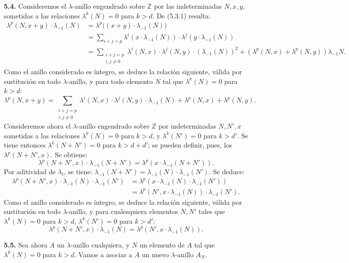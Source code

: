\textbf{5.4.} Consideremos el \(\lambda\)-anillo engendrado sobre \(\mathbb Z\) por las indeterminadas \(N,x,y\), sometidas a las relaciones \(\lambda^k(N)=0\) para \(k>d\). De (5.3.1) resulta:
\begin{align*}
  \lambda^p(N,x+y)\cdot\lambda_{-1}(N)
  &=\lambda^p\bigl((x+y)\cdot\lambda_{-1}(N)\bigr)\\
  &=\sum_{i+j=p}\lambda^i(x\cdot\lambda_{-1}(N))\cdot\lambda^j(y\cdot\lambda_{-1}(N))\\
  &=\sum_{\substack{i+j=p\\ i,j\ne0}}\lambda^i(N,x)\cdot\lambda^j(N,y)\cdot(\lambda_{-1}(N))^2
    +(\lambda^p(N,x)+\lambda^p(N,y))\lambda_{-1}N.
\end{align*}
Como el anillo considerado es íntegro, se deduce la relación siguiente, válida por sustitución en todo \(\lambda\)-anillo, y para todo elemento \(N\) tal que \(\lambda^k(N)=0\) para \(k>d\):
\begin{equation}\tag{5.4.1}
  \lambda^p(N,x+y)=\sum_{\substack{i+j=p\\ i,j\ne0}}\lambda^i(N,x)\cdot\lambda^j(N,y)\cdot\lambda_{-1}(N)+\lambda^p(N,x)+\lambda^p(N,y).
\end{equation}
Consideremos ahora el \(\lambda\)-anillo engendrado sobre \(\mathbb Z\) por indeterminadas \(N,N',x\) sometidas a las relaciones \(\lambda^k(N)=0\) para \(k>d\), y \(\lambda^k(N')=0\) para \(k>d'\). Se tiene entonces \(\lambda^k(N+N')=0\) para \(k>d+d'\); se pueden definir, pues, los \(\lambda^p(N+N',x)\). Se obtiene:
\[
  \lambda^p(N+N',x)\cdot\lambda_{-1}(N+N')=\lambda^p(x\cdot\lambda_{-1}(N+N')).
\]
Por aditividad de \(\lambda_t\), se tiene: \(\lambda_{-1}(N+N')=\lambda_{-1}(N)\cdot\lambda_{-1}(N')\). Se deduce:
\begin{align*}
  \lambda^p(N+N',x)\cdot\lambda_{-1}(N)\cdot\lambda_{-1}(N')
  &=\lambda^p(x\cdot\lambda_{-1}(N)\cdot\lambda_{-1}(N'))\\
  &=\lambda^p(N',x\cdot\lambda_{-1}(N))\cdot\lambda_{-1}(N').
\end{align*}
Como el anillo considerado es íntegro, se deduce la relación siguiente, válida por sustitución en todo \(\lambda\)-anillo, y para cualesquiera elementos \(N,N'\) tales que \(\lambda^k(N)=0\) para \(k>d\), \(\lambda^k(N')=0\) para \(k>d'\):
\begin{equation}\tag{5.4.2}
  \lambda^p(N+N',x)\cdot\lambda_{-1}(N)=\lambda^p(N',x\cdot\lambda_{-1}(N)).
\end{equation}


\textbf{5.5.} Sea ahora \(A\) un \(\lambda\)-anillo cualquiera, y \(N\) un elemento de \(A\) tal que \(\lambda^k(N)=0\) para \(k>d\). Vamos a asociar a \(A\) un nuevo \(\lambda\)-anillo \(A_N\).


